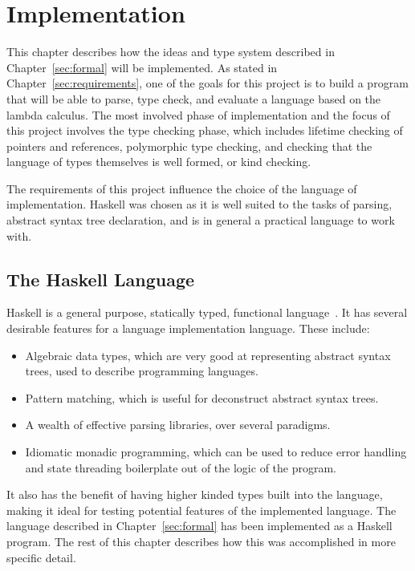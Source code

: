 \chapter{Implementation}\label{sec:impl}
This chapter describes how the ideas and type system described in
Chapter~\ref{sec:formal} will be implemented. As stated in
Chapter~\ref{sec:requirements}, one of the goals for this project is to build a
program that will be able to parse, type check, and evaluate a language based
on the lambda calculus. The most involved phase of implementation and the focus
of this project involves the type checking phase, which includes lifetime
checking of pointers and references, polymorphic type checking, and checking
that the language of types themselves is well formed, or kind checking.

The requirements of this project influence the choice of the language of
implementation. Haskell was chosen as it is well suited to the tasks of
parsing, abstract syntax tree declaration, and is in general a practical
language to work with.

\section{The Haskell Language}
Haskell is a general purpose, statically typed, functional
language~\cite{haskell}. It has several desirable features for a language
implementation language. These include:

\begin{itemize}
\item Algebraic data types, which are very good at representing abstract syntax
trees, used to describe programming languages.
\item Pattern matching, which is useful for deconstruct abstract syntax trees.
\item A wealth of effective parsing libraries, over several paradigms.
\item Idiomatic monadic programming, which can be used to reduce error handling
and state threading boilerplate out of the logic of the program.
\end{itemize}

It also has the benefit of having higher kinded types built into the language,
making it ideal for testing potential features of the implemented language.
The language described in Chapter~\ref{sec:formal} has been implemented as a
Haskell program. The rest of this chapter describes how this was accomplished
in more specific detail.


